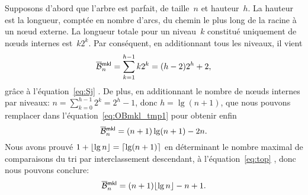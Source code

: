 Supposons d'abord que l'arbre est parfait, de taille~\(n\) et
hauteur~\(h\). La hauteur est la
longueur, comptée en nombre d'arcs, du chemin le plus long de la
racine à un nœud externe. La longueur totale pour un niveau~\(k\)
constitué uniquement de nœuds internes est~\(k2^k\). Par
conséquent, en additionnant tous les niveaux, il vient
\begin{equation}
\OB{\fun{mkl}}{n} = \sum_{k=1}^{h-1}k2^k = (h-2)2^h + 2,
\label{eq:OBmkl_tmp1}
\end{equation}
grâce à l'équation~\eqref{eq:Sj} . De plus, en
additionnant le nombre de nœuds internes par niveaux: \(n =
\sum_{k=0}^{h-1}2^k = 2^{h} - 1\), donc \(h = \lg(n+1)\), que nous
pouvons remplacer dans l'équation~\eqref{eq:OBmkl_tmp1} pour obtenir
enfin
\begin{equation*}
\OB{\fun{mkl}}{n} = (n+1)\lg(n+1) - 2n.
\end{equation*}
Nous avons prouvé \(1 + \lfloor{\lg n}\rfloor = \lceil{\lg(n+1)}\rceil\) en
déterminant le nombre maximal de comparaisons du tri par
interclassement descendant, à l'équation~\eqref{eq:top}
, donc nous pouvons conclure:
\begin{equation}
\OB{\fun{mkl}}{n} = (n+1)\floor{\lg n} - n + 1.
\index{mkl@$\OB{\fun{mkl}}{n}$}
\label{eq:OBmkl_perfect}
\end{equation}

